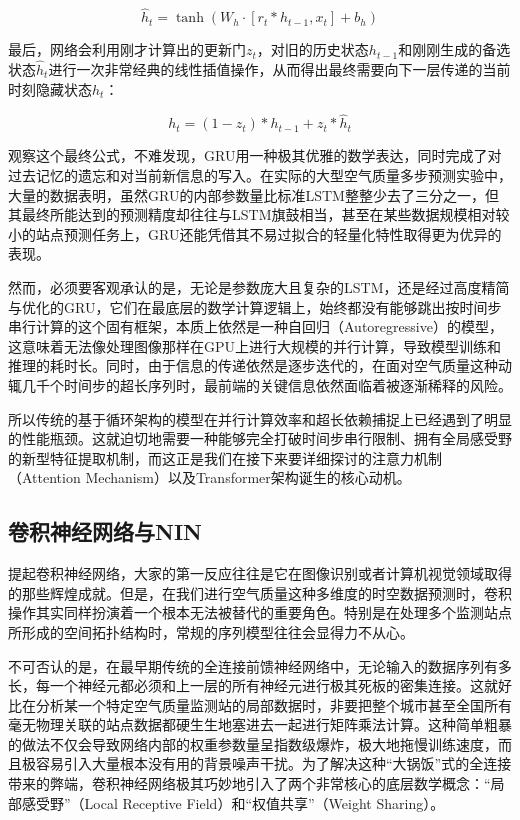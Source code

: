 \begin{equation}\label{eq:GRU_Candidate}
    \hat{h}_t = \tanh(W_h \cdot [r_t * h_{t-1}, x_t] + b_h)
\end{equation}

最后，网络会利用刚才计算出的更新门$z_t$，对旧的历史状态$h_{t-1}$和刚刚生成的备选状态$\hat{h}_t$进行一次非常经典的线性插值操作，从而得出最终需要向下一层传递的当前时刻隐藏状态$h_t$：

\begin{equation}\label{eq:GRU_Hidden}
    h_t = (1 - z_t) * h_{t-1} + z_t * \hat{h}_t
\end{equation}

观察这个最终公式，不难发现，GRU用一种极其优雅的数学表达，同时完成了对过去记忆的遗忘和对当前新信息的写入。在实际的大型空气质量多步预测实验中，大量的数据表明，虽然GRU的内部参数量比标准LSTM整整少去了三分之一，但其最终所能达到的预测精度却往往与LSTM旗鼓相当，甚至在某些数据规模相对较小的站点预测任务上，GRU还能凭借其不易过拟合的轻量化特性取得更为优异的表现。

然而，必须要客观承认的是，无论是参数庞大且复杂的LSTM，还是经过高度精简与优化的GRU，它们在最底层的数学计算逻辑上，始终都没有能够跳出按时间步串行计算的这个固有框架，本质上依然是一种自回归（Autoregressive）的模型，这意味着无法像处理图像那样在GPU上进行大规模的并行计算，导致模型训练和推理的耗时长。同时，由于信息的传递依然是逐步迭代的，在面对空气质量这种动辄几千个时间步的超长序列时，最前端的关键信息依然面临着被逐渐稀释的风险。

所以传统的基于循环架构的模型在并行计算效率和超长依赖捕捉上已经遇到了明显的性能瓶颈。这就迫切地需要一种能够完全打破时间步串行限制、拥有全局感受野的新型特征提取机制，而这正是我们在接下来要详细探讨的注意力机制（Attention Mechanism）以及Transformer架构诞生的核心动机。

\subsection{卷积神经网络与NIN}

提起卷积神经网络，大家的第一反应往往是它在图像识别或者计算机视觉领域取得的那些辉煌成就。但是，在我们进行空气质量这种多维度的时空数据预测时，卷积操作其实同样扮演着一个根本无法被替代的重要角色。特别是在处理多个监测站点所形成的空间拓扑结构时，常规的序列模型往往会显得力不从心。

不可否认的是，在最早期传统的全连接前馈神经网络中，无论输入的数据序列有多长，每一个神经元都必须和上一层的所有神经元进行极其死板的密集连接。这就好比在分析某一个特定空气质量监测站的局部数据时，非要把整个城市甚至全国所有毫无物理关联的站点数据都硬生生地塞进去一起进行矩阵乘法计算。这种简单粗暴的做法不仅会导致网络内部的权重参数量呈指数级爆炸，极大地拖慢训练速度，而且极容易引入大量根本没有用的背景噪声干扰。为了解决这种“大锅饭”式的全连接带来的弊端，卷积神经网络极其巧妙地引入了两个非常核心的底层数学概念：“局部感受野”（Local Receptive Field）和“权值共享”（Weight Sharing）。

